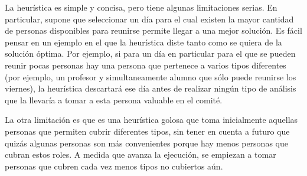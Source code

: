 \documentclass[a4paper,11pt]{article}
\begin{document}
La heurística es simple y concisa, pero tiene algunas limitaciones serias. En
particular, supone que seleccionar un día para el cual existen la mayor
cantidad de personas disponibles para reunirse permite llegar a una mejor
solución. Es fácil pensar en un ejemplo en el que la heurística diste tanto
como se quiera de la solución óptima. Por ejemplo, si para un día en particular
para el que se pueden reunir pocas personas hay una persona que pertenece a
varios tipos diferentes (por ejemplo, un profesor y simultaneamente alumno que
sólo puede reunirse los viernes), la heurística descartará ese día antes de
realizar ningún tipo de análisis que la llevaría a tomar a esta persona
valuable en el comité.

La otra limitación es que es una heurística golosa que toma inicialmente
aquellas personas que permiten cubrir diferentes tipos, sin tener en cuenta a
futuro que quizás algunas personas son más convenientes porque hay menos
personas que cubran estos roles. A medida que avanza la ejecución, se empiezan
a tomar personas que cubren cada vez menos tipos no cubiertos aún.
\end{document}
